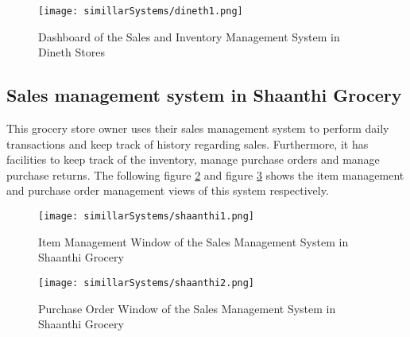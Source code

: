 \documentclass[12pt]{report}
\begin{document}
\begin{figure}[H]
	\centering
	\texttt{[image: simillarSystems/dineth1.png]}
	\caption{Dashboard of the Sales and Inventory Management System in Dineth Stores}
	\label{fig:dineth1}
\end{figure}

\subsection{Sales management system in Shaanthi Grocery}

This grocery store owner uses their sales management system to perform daily transactions and keep track of history regarding sales.  Furthermore, it has facilities to keep track of the inventory, manage purchase orders and manage purchase returns. The following figure \ref{fig:shaanthi1} and figure \ref{fig:shaanthi2} shows the item management and purchase order management views of this system respectively.

\begin{figure}[H]
	\centering
	\texttt{[image: simillarSystems/shaanthi1.png]}
	\caption{Item Management Window of the Sales Management System in Shaanthi Grocery}
	\label{fig:shaanthi1}
\end{figure}

\begin{figure}[H]
	\centering
	\texttt{[image: simillarSystems/shaanthi2.png]}
	\caption{Purchase Order Window of the Sales Management System in Shaanthi Grocery}
	\label{fig:shaanthi2}
\end{figure}
\end{document}
